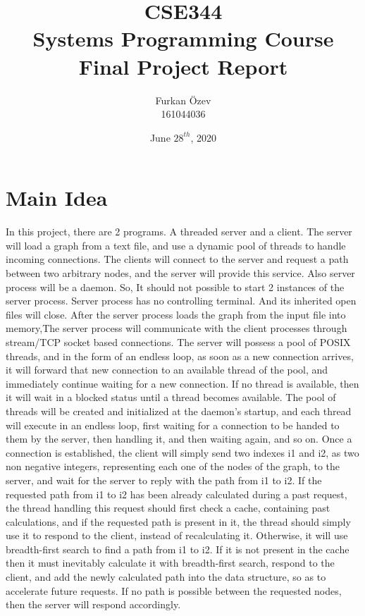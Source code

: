 \documentclass{article}
\title{CSE344 \protect\\ Systems Programming Course \protect\\ Final Project Report}
\author{Furkan Özev \protect\\161044036 }
\date{June $28^{th}$, 2020}
\begin{document}
\maketitle

\section{Main Idea}
\noindent In this project, there are 2 programs. A threaded server and a client. The server will load a graph from a text file, and use a dynamic pool of threads to handle incoming connections. The clients will connect to the server and request a path between two arbitrary nodes, and the server will provide this service.
\newline \newline Also server process will be a daemon. So, It should not possible to start 2 instances of the server process. Server process has no controlling terminal. And its inherited open files will close.
\newline \newline After the server process loads the graph from the input file into memory,The server process will communicate with the client processes through stream/TCP socket based connections. The server will possess a pool of POSIX threads, and in the form of an endless loop, as soon as a new connection arrives, it will forward that new connection to an available thread of the pool, and immediately continue waiting for a new connection. If no thread is available, then it will wait in a blocked status until a thread becomes available. The pool of threads will be created and initialized at the daemon’s startup, and each thread will execute in an endless loop, first waiting for a connection to be handed to them by the server, then handling it, and then waiting again, and so on.
\newline \newline Once a connection is established, the client will simply send two indexes i1 and i2, as two non negative integers, representing each one of the nodes of the graph, to the server, and wait for the server to reply with the path from i1 to i2. If the requested path from i1 to i2 has been already calculated during a past request, the thread handling this request should first check a cache, containing past calculations, and if the requested path is present in it, the thread should simply use it to respond to the client, instead of recalculating it. Otherwise, it will use breadth-first search to find a path from i1 to i2. If it is not present in the cache then it must inevitably calculate it with breadth-first search, respond to the client, and add the newly calculated path into the data structure, so as to accelerate future requests. If no path is possible between the requested nodes, then the server will respond accordingly.
\end{document}
